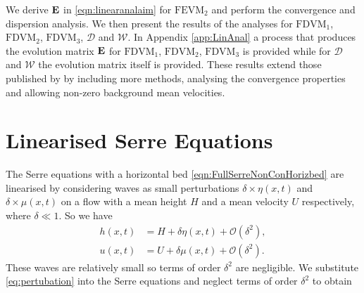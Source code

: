 We derive $\mathbf{E}$ in \eqref{eqn:linearanalaim} for $\text{FEVM}_2$ and perform the convergence and dispersion analysis. We then present the results of the analyses for $\text{FDVM}_1$, $\text{FDVM}_2$, $\text{FDVM}_3$, $\mathcal{D}$ and $\mathcal{W}$. In Appendix \ref{app:LinAnal} a process that produces the evolution matrix $\mathbf{E}$ for $\text{FDVM}_1$, $\text{FDVM}_2$, $\text{FDVM}_3$ is provided while for $\mathcal{D}$ and $\mathcal{W}$ the evolution matrix itself is provided. These results extend those published by \citet{Zoppou-etal-2017} by including more methods, analysing the convergence properties and allowing non-zero background mean velocities.
 
\section{Linearised Serre Equations}
The Serre equations with a horizontal bed \eqref{eqn:FullSerreNonConHorizbed} are linearised by considering waves as small perturbations $\delta\times\eta(x,t)$ and $\delta \times\mu(x,t)$ on a flow with a mean height $H$ and a mean velocity $U$ respectively, where $\delta \ll 1$. So we have
\begin{subequations}
	\label{eq:pertubation}
\begin{align}
h(x,t) &= H + \delta \eta(x,t) + \mathcal{O}\left(\delta^2 \right), \\
u(x,t) &= U + \delta \mu(x,t) + \mathcal{O}\left(\delta^2 \right).
\end{align}
\end{subequations} These waves are relatively small so terms of order $\delta^2$ are negligible. We substitute \eqref{eq:pertubation} into the Serre equations and neglect terms of order $\delta^2$ to obtain

